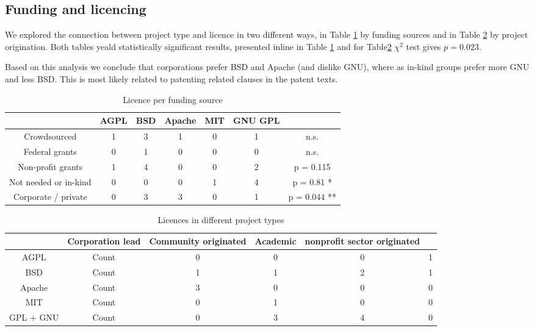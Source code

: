 \subsection{Funding and licencing}

We explored the connection between project type and licence in two different ways, in Table \ref{tab:licence_per_fudning} by funding sources and in Table \ref{tab:licence_per_project_type} by project origination. Both tables yeald statistically significant results, presented inline in Table \ref{tab:licence_per_fudning} and for Table\ref{tab:licence_per_project_type} $\chi^2$ test gives $p=0.023$.

Based on this analysis we conclude that corporations prefer BSD and Apache (and dislike GNU), where as in-kind groups prefer more GNU and less BSD. This is most likely related to patenting related clauses in the patent texts.

\begin{table}[htbp]
  \centering
  \caption{Licence per funding source}
    \begin{tabular}{|c|c|c|c|c|c|c|}
          & AGPL  & BSD   & Apache & MIT   & GNU GPL &  \\
\hline
    Crowdsourced & 1     & 3     & 1     & 0     & 1     & n.s. \\
    Federal grants & 0     & 1     & 0     & 0     & 0     & n.s. \\
    Non-profit grants & 1     & 4     & 0     & 0     & 2     & p = 0.115 \\
    Not needed or in-kind & 0     & 0     & 0     & 1     & 4     & p = 0.81 * \\
    Corporate / private & 0     & 3     & 3     & 0     & 1     & p = 0.044 ** \\
    \hline
    \end{tabular}
  \label{tab:licence_per_fudning}
\end{table}

\begin{table}[htbp]
  \centering
  \caption{Licences in different project types}
    \begin{tabular}{|c|c|c|c|c|c|}
    \hline
          & Corporation lead& Community originated & Academic  & nonprofit sector originated &  \\
    \hline
    AGPL  & Count & 0     & 0     & 0     & 1 \\
    BSD   & Count & 1     & 1     & 2     & 1 \\
    Apache & Count & 3     & 0     & 0     & 0 \\
    MIT   & Count & 0     & 1     & 0     & 0 \\
    GPL + GNU & Count & 0     & 3     & 4     & 0 \\
    \hline
    \end{tabular}
  \label{tab:licence_per_project_type}
\end{table}%